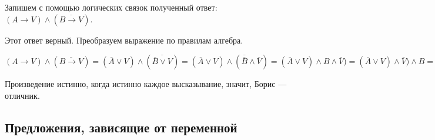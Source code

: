 \documentclass{article}
\begin{document}
    Запишем с помощью логических связок полученный ответ: \((A \rightarrow V) \wedge (\overline{B \rightarrow V})\).

    Этот ответ верный. Преобразуем выражение по правилам алгебра.

    \((A \rightarrow V) \wedge (\overline{B \rightarrow V}) = (\overline{A} \vee V) \wedge (\overline{\overline B \vee V}) = (\overline{A} \vee V) \wedge (\overline{\overline B} \wedge \overline{V}) = (\overline{A} \vee V) \wedge B \wedge \overline{V}) = (\overline{A} \vee V) \wedge \overline{V}) \wedge B = [(\overline{A} \wedge \overline{V}) \vee (V \wedge \overline{V})] \wedge B = [(\overline{A} \wedge \overline{V}) \vee L] \wedge B = \overline{A} \wedge \overline{V} \wedge B\)

    Произведение истинно, когда истинно каждое высказывание, значит, Борис --- отличник.

    \subsection{Предложения, зависящие от переменной}
\end{document}
